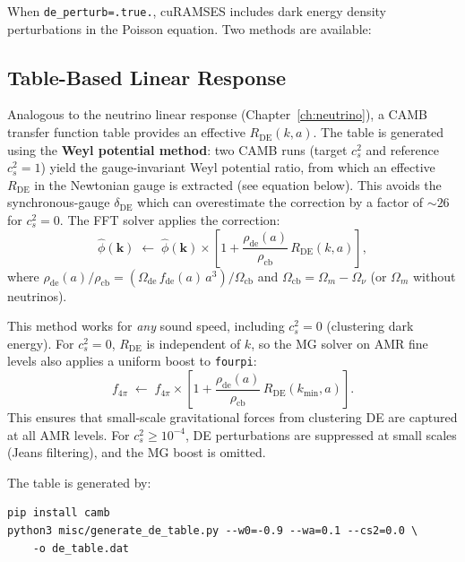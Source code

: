 \documentclass[11pt,fleqn]{book}
\begin{document}
When \texttt{de\_perturb=.true.}, cuRAMSES includes dark energy density
perturbations in the Poisson equation.  Two methods are available:

\subsection{Table-Based Linear Response}

Analogous to the neutrino linear response (Chapter~\ref{ch:neutrino}),
a CAMB transfer function table provides an effective $R_{\mathrm{DE}}(k,a)$.
The table is generated using the \textbf{Weyl potential method}: two CAMB
runs (target $c_s^2$ and reference $c_s^2=1$) yield the gauge-invariant
Weyl potential ratio, from which an effective $R_{\mathrm{DE}}$ in the
Newtonian gauge is extracted (see equation below).  This avoids the
synchronous-gauge $\delta_{\mathrm{DE}}$ which can overestimate the
correction by a factor of ${\sim}26$ for $c_s^2=0$.
The FFT solver applies the correction:
\begin{equation}\label{eq:de_factor_table}
  \hat\phi(\mathbf{k}) \;\leftarrow\; \hat\phi(\mathbf{k}) \times
  \left[1 + \frac{\rho_{\mathrm{de}}(a)}{\rho_{\mathrm{cb}}}\,
  R_{\mathrm{DE}}(k,a)\right],
\end{equation}
where $\rho_{\mathrm{de}}(a)/\rho_{\mathrm{cb}} = (\Omega_{\mathrm{de}}\,
f_{\mathrm{de}}(a)\,a^3) / \Omega_{\mathrm{cb}}$ and $\Omega_{\mathrm{cb}}
= \Omega_m - \Omega_\nu$ (or $\Omega_m$ without neutrinos).

This method works for \emph{any} sound speed, including $c_s^2 = 0$ (clustering
dark energy).  For $c_s^2 = 0$, $R_{\mathrm{DE}}$ is independent of $k$, so
the MG solver on AMR fine levels also applies a uniform boost to \texttt{fourpi}:
\begin{equation}
  f_{4\pi} \;\leftarrow\; f_{4\pi} \times
  \left[1 + \frac{\rho_{\mathrm{de}}(a)}{\rho_{\mathrm{cb}}}\,
  R_{\mathrm{DE}}(k_{\min},a)\right].
\end{equation}
This ensures that small-scale gravitational forces from clustering DE are
captured at all AMR levels.  For $c_s^2 \geq 10^{-4}$, DE perturbations
are suppressed at small scales (Jeans filtering), and the MG boost is omitted.

The table is generated by:
\begin{codebox}
\begin{lstlisting}[style=fortran,numbers=none]
pip install camb
python3 misc/generate_de_table.py --w0=-0.9 --wa=0.1 --cs2=0.0 \
    -o de_table.dat
\end{lstlisting}
\end{codebox}
\end{document}
